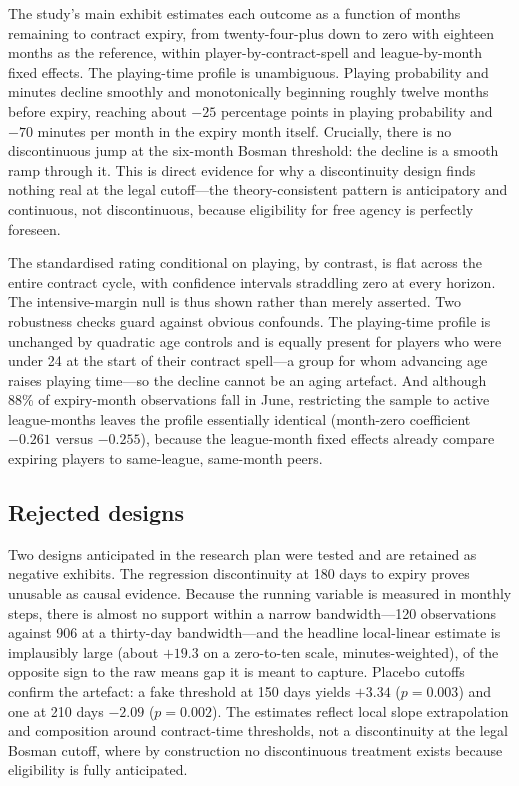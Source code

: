 The study's main exhibit estimates each outcome as a function of months
remaining to contract expiry, from twenty-four-plus down to zero with eighteen
months as the reference, within player-by-contract-spell and league-by-month
fixed effects. The playing-time profile is unambiguous. Playing probability and
minutes decline smoothly and monotonically beginning roughly twelve months
before expiry, reaching about $-25$ percentage points in playing probability and
$-70$ minutes per month in the expiry month itself. Crucially, there is no
discontinuous jump at the six-month Bosman threshold: the decline is a smooth
ramp through it. This is direct evidence for why a discontinuity design finds
nothing real at the legal cutoff---the theory-consistent pattern is anticipatory
and continuous, not discontinuous, because eligibility for free agency is
perfectly foreseen.

The standardised rating conditional on playing, by contrast, is flat across the
entire contract cycle, with confidence intervals straddling zero at every
horizon. The intensive-margin null is thus shown rather than merely asserted.
Two robustness checks guard against obvious confounds. The playing-time profile
is unchanged by quadratic age controls and is equally present for players who
were under 24 at the start of their contract spell---a group for whom advancing
age raises playing time---so the decline cannot be an aging artefact. And
although 88\% of expiry-month observations fall in June, restricting the sample
to active league-months leaves the profile essentially identical (month-zero
coefficient $-0.261$ versus $-0.255$), because the league-month fixed effects
already compare expiring players to same-league, same-month peers.

\subsection{Rejected designs}
\label{sec:results-rejected}

Two designs anticipated in the research plan were tested and are retained as
negative exhibits. The regression discontinuity at 180 days to expiry proves
unusable as causal evidence. Because the running variable is measured in monthly
steps, there is almost no support within a narrow bandwidth---120 observations
against 906 at a thirty-day bandwidth---and the headline local-linear estimate is
implausibly large (about $+19.3$ on a zero-to-ten scale, minutes-weighted), of
the opposite sign to the raw means gap it is meant to capture. Placebo cutoffs
confirm the artefact: a fake threshold at 150 days yields $+3.34$ ($p = 0.003$)
and one at 210 days $-2.09$ ($p = 0.002$). The estimates reflect local slope
extrapolation and composition around contract-time thresholds, not a
discontinuity at the legal Bosman cutoff, where by construction no discontinuous
treatment exists because eligibility is fully anticipated.

